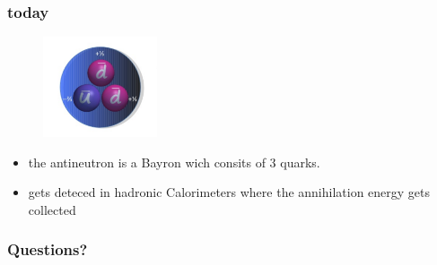 \documentclass{beamer}
\begin{document}
\begin{frame}
\frametitle{today}
\begin{figure}
  \includegraphics[width=0.3\textwidth]{Antineutron}
\end{figure}
\begin{itemize}
  \item the antineutron is a Bayron wich consits of 3 quarks.
  \item gets deteced in hadronic Calorimeters where the annihilation energy gets collected
\end{itemize}
\end{frame}

\begin{frame}
\frametitle{Questions?}
\end{frame}



\end{document}
